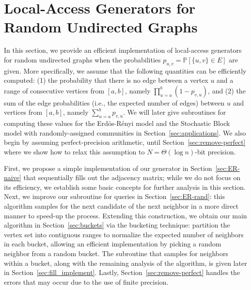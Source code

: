 \section{Local-Access Generators for Random Undirected Graphs}\label{sec:undirected}

In this section, we provide an efficient implementation of local-access generators for random undirected graphs when the probabilities $p_{u,v} = \mathbb P[\{u,v\} \in E]$ are given. More specifically, we assume that the following quantities can be efficiently computed:
(1) the probability that there is no edge between a vertex $u$ and a range of consecutive vertices from $[a,b]$, namely $\prod_{u=a}^b (1-p_{v,u})$, and
(2) the sum of the edge probabilities (i.e., the expected number of edges) between $u$ and vertices from $[a,b]$, namely $\sum_{u=a}^b p_{v,u}$. We will later give subroutines for computing these values for the Erd\"{o}s-R\'{e}nyi model and the Stochastic Block model with randomly-assigned communities in Section~\ref{sec:applications}. We also begin by assuming perfect-precision arithmetic, until Section~\ref{sec:remove-perfect} where we show how to relax this assumption to $N = \Theta(\log n)$-bit precision.

First, we propose a simple implementation of our generator in Section~\ref{sec:ER-naive} that sequentially fills out the adjacency matrix; while we do not focus on its efficiency, we establish some basic concepts for further analysis in this section. Next, we improve our subroutine for  queries in Section~\ref{sec:ER-rand}: this algorithm samples for the next candidate of the next neighbor in a more direct manner to speed-up the process. Extending this construction, we obtain our main algorithm in Section~\ref{sec:buckets} via the bucketing technique: partition the vertex set into contiguous ranges to normalize the expected number of neighbors in each bucket, allowing an efficient  implementation by picking a random neighbor from a random bucket. The subroutine that samples for neighbors within a bucket, along with the remaining analysis of the algorithm, is given later in Section~\ref{sec:fill_implement}. Lastly, Section~\ref{sec:remove-perfect} handles the errors that may occur due to the use of finite precision.

\iffalse
{\color{blue}
Alternatively, we provide an implementation for these two models with a deterministic performance guarantee in Section~\ref{sec:ER-det}.
In this setting, introducing the \func{Vertex-Pair} queries results in an amortized guarantee on the run-time.
The deterministic guarantee comes at the cost of more complicated data-structures
(we use a two-level nested interval tree and binary search tree).
}
\fi




